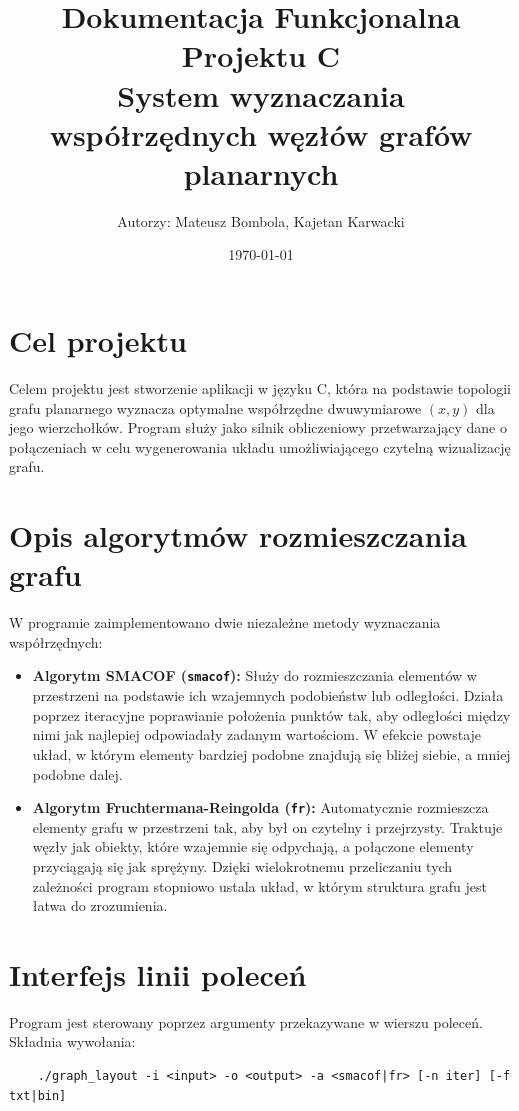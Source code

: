 \documentclass[12pt,a4paper]{article}
\title{Dokumentacja Funkcjonalna Projektu C\\ \large System wyznaczania współrzędnych węzłów grafów planarnych}
\author{Autorzy: Mateusz Bombola, Kajetan Karwacki}
\date{\today}
\begin{document}
\maketitle
\newpage
\tableofcontents
\newpage

\section{Cel projektu}
Celem projektu jest stworzenie aplikacji w języku C, która na podstawie topologii grafu planarnego wyznacza optymalne współrzędne dwuwymiarowe $(x, y)$ dla jego wierzchołków. Program służy jako silnik obliczeniowy przetwarzający dane o połączeniach w celu wygenerowania układu umożliwiającego czytelną wizualizację grafu.

\section{Opis algorytmów rozmieszczania grafu}
W programie zaimplementowano dwie niezależne metody wyznaczania współrzędnych:

\begin{itemize}
    \item \textbf{Algorytm SMACOF (\texttt{smacof}):} Służy do rozmieszczania elementów w przestrzeni na podstawie ich wzajemnych podobieństw lub odległości. Działa poprzez iteracyjne poprawianie położenia punktów tak, aby odległości między nimi jak najlepiej odpowiadały zadanym wartościom. W efekcie powstaje układ, w którym elementy bardziej podobne znajdują się bliżej siebie, a mniej podobne dalej.
    
    \item \textbf{Algorytm Fruchtermana-Reingolda (\texttt{fr}):} Automatycznie rozmieszcza elementy grafu w przestrzeni tak, aby był on czytelny i przejrzysty. Traktuje węzły jak obiekty, które wzajemnie się odpychają, a połączone elementy przyciągają się jak sprężyny. Dzięki wielokrotnemu przeliczaniu tych zależności program stopniowo ustala układ, w którym struktura grafu jest łatwa do zrozumienia.
\end{itemize}

\section{Interfejs linii poleceń}
Program jest sterowany poprzez argumenty przekazywane w wierszu poleceń. Składnia wywołania:
\begin{center}
    \begin{verbatim}
    ./graph_layout -i <input> -o <output> -a <smacof|fr> [-n iter] [-f txt|bin]
    \end{verbatim}
\end{center}
\end{document}
